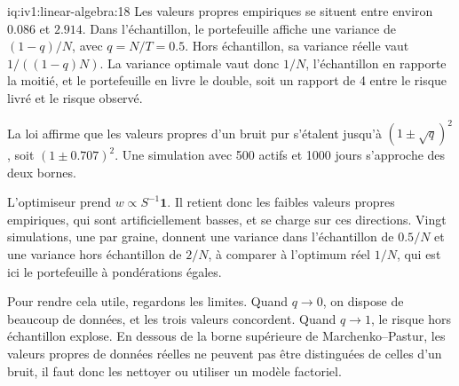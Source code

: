 \begin{solution}{iq:iv1:linear-algebra:18}
Les valeurs propres empiriques se situent entre environ $0.086$ et $2.914$. Dans l'échantillon, le portefeuille affiche une variance de $(1 - q)/N$, avec $q = N/T = 0.5$. Hors échantillon, sa variance réelle vaut $1/((1 - q)N)$. La variance optimale vaut donc $1/N$, l'échantillon en rapporte la moitié, et le portefeuille en livre le double, soit un rapport de 4 entre le risque livré et le risque observé.

La loi affirme que les valeurs propres d'un bruit pur s'étalent jusqu'à $(1 \pm \sqrt{q})^2$, soit $(1 \pm 0.707)^2$. Une simulation avec 500 actifs et 1000 jours s'approche des deux bornes.

L'optimiseur prend $w \propto S^{-1}\mathbf{1}$. Il retient donc les faibles valeurs propres empiriques, qui sont artificiellement basses, et se charge sur ces directions. Vingt simulations, une par graine, donnent une variance dans l'échantillon de $0.5/N$ et une variance hors échantillon de $2/N$, à comparer à l'optimum réel $1/N$, qui est ici le portefeuille à pondérations égales.

Pour rendre cela utile, regardons les limites. Quand $q \to 0$, on dispose de beaucoup de données, et les trois valeurs concordent. Quand $q \to 1$, le risque hors échantillon explose. En dessous de la borne supérieure de Marchenko--Pastur, les valeurs propres de données réelles ne peuvent pas être distinguées de celles d'un bruit, il faut donc les nettoyer ou utiliser un modèle factoriel.

\end{solution}

